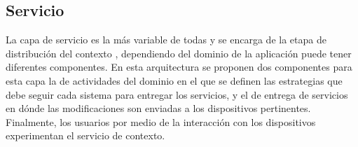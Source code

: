 \subsection{Servicio}
\label{subsec:Prop_Servicio}

La capa de servicio es la más variable de todas y se encarga de la etapa de distribución del contexto \cite{Perera2014}, dependiendo del dominio de la aplicación puede tener diferentes componentes. En esta arquitectura se proponen dos componentes para esta capa la de actividades del dominio en el que se definen las estrategias que debe seguir cada sistema para entregar los servicios, y el de entrega de servicios en dónde las modificaciones son enviadas a los dispositivos pertinentes. Finalmente, los usuarios por medio de la interacción con los dispositivos experimentan el servicio de contexto.